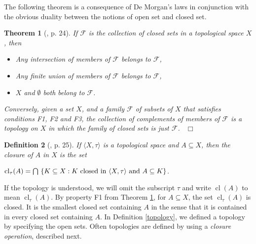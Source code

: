 \documentclass[12pt, oneside]{book}
\newtheorem{theorem}{Theorem}[subsection]
\newtheorem{definition}[theorem]{Definition}
\newcommand{\qed}{\hfill ~$\Box$\\}
\def\cl{\operatorname{cl}}
\begin{document}
\noindent The following theorem is a consequence of De Morgan's laws in conjunction
with the obvious duality between the notions of open set and closed set.

\begin{theorem}[\cite{W2}, p. 24] \label{defnClosedSets}
\normalfont
If $\mathscr{F}$ is the collection of closed sets in a topological space $X$, then 
\begin{itemize}
\item [F1.] \quad Any intersection of members of  $\mathscr{F}$ belongs to  $\mathscr{F}$,
\item [F2.] \quad Any finite union of members of  $\mathscr{F}$ belongs to  $\mathscr{F}$,
\item [F3.] \quad $X$ and $\emptyset$ both belong to  $\mathscr{F}$.
\end{itemize}
\noindent Conversely, given a set $X$, and a family  $\mathscr{F}$ of subsets of $X$ that satisfies
conditions F1, F2 and F3, the collection of complements of members of  $\mathscr{F}$ is a topology 
on $X$ in which the family of closed sets is just  $\mathscr{F}$. \qed
\end{theorem}
\begin{definition}[\cite{W2}, p. 25] 
\normalfont
If $\langle X, \tau \rangle$ is a topological space and $A \subseteq X$, then the {\sl closure} of $A$ in $X$ is the set 
\begin{center}
$\cl_{\tau}(A) = \bigcap\ \{K \subseteq X : K\ \text{closed in}\ \langle X, \tau \rangle \
 \textup{and}\ A \subseteq K \}$.
\end{center}
\end{definition}
\noindent If the topology is understood, we will omit the subscript $\tau$ and write 
$\cl(A)$ to mean $\cl_{\tau}(A)$.
\vskip 0.3cm
\noindent By property F1 from Theorem \ref{defnClosedSets}, for $A \subseteq X$, 
the set $\cl_{\tau}(A)$ is closed. It is the smallest closed set containing $A$ in the sense 
that it is contained in every closed set containing $A$.
\vskip 0.3cm
\noindent In Definition \ref{topology}, we defined a topology by specifying the open sets. 
Often topologies are defined by using a {\sl closure operation}, described next.
\end{document}
